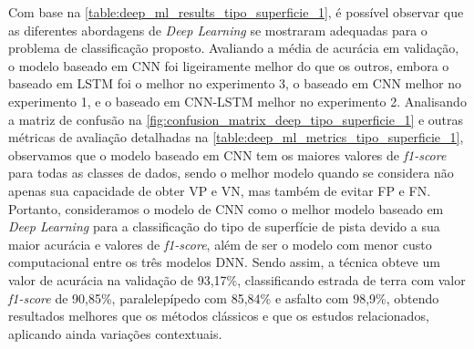 Com base na \autoref{table:deep_ml_results_tipo_superficie_1}, é possível observar que as diferentes abordagens de \textit{Deep Learning} se mostraram adequadas para o problema de classificação proposto. Avaliando a média de acurácia em validação, o modelo baseado em CNN foi ligeiramente melhor do que os outros, embora o baseado em LSTM foi o melhor no experimento 3, o baseado em CNN melhor no experimento 1, e o baseado em CNN-LSTM melhor no experimento 2. Analisando a matriz de confusão na \autoref{fig:confusion_matrix_deep_tipo_superficie_1} e outras métricas de avaliação detalhadas na \autoref{table:deep_ml_metrics_tipo_superficie_1}, observamos que o modelo baseado em CNN tem os maiores valores de \textit{f1-score} para todas as classes de dados, sendo o melhor modelo quando se considera não apenas sua capacidade de obter VP e VN, mas também de evitar FP e FN. Portanto, consideramos o modelo de CNN como o melhor modelo baseado em \textit{Deep Learning} para a classificação do tipo de superfície de pista devido a sua maior acurácia e valores de \textit{f1-score}, além de ser o modelo com menor custo computacional entre os três modelos DNN. Sendo assim, a técnica obteve um valor de acurácia na validação de 93,17\%, classificando estrada de terra com valor \textit{f1-score} de 90,85\%, paralelepípedo com 85,84\% e asfalto com 98,9\%, obtendo resultados melhores que os métodos clássicos e que os estudos relacionados, aplicando ainda variações contextuais.
